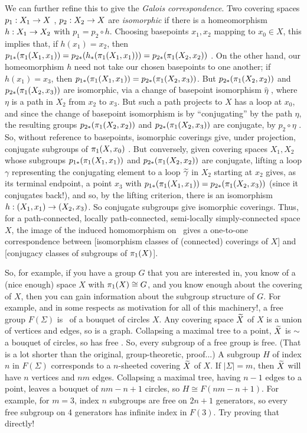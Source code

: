 We can further refine this to give the {\it Galois correspondence}. Two covering spaces
$p_1:X_1\rightarrow X$ , $p_2:X_2\rightarrow X$ are {\it isomorphic} if there is a homeomorphism
$h:X_1\rightarrow X_2$ with $p_1=p_2\circ h$. Choosing basepoints $x_1,x_2$ mapping to $x_0\in X$,
this implies that, if $h(x_1)=x_2$, then $p_{1*}(\pi_1(X_1,x_1)) = p_{2*}(h_*(\pi_1(X_1,x_1))) = 
p_{2*}(\pi_1(X_2,x_2))$ . On the other hand, our homeomorphism $h$ need not take our
chosen basepoints to one another; if $h(x_1)=x_3$, then $p_{1*}(\pi_1(X_1,x_1)) = p_{2*}(\pi_1(X_2,x_3))$.
But  $p_{2*}(\pi_1(X_2,x_2))$ and $p_{2*}(\pi_1(X_2,x_3))$ are isomorphic, via a change 
of basepoint isomorphism $\widehat{\eta}$ , where $\eta$ is a path in $X_2$ from $x_2$ to $x_3$.
But such a path projects to $X$ has a loop at $x_0$, and since the change of basepoint isomorphism
is by ``conjugating'' by the path $\eta$, the resulting groups $p_{2*}(\pi_1(X_2,x_2))$ and $p_{2*}(\pi_1(X_2,x_3))$
are conjugate, by $p_2\circ \eta$ . So, without reference to basepoints, isomorphic coverings give,
under projection, conjugate subgroups of $\pi_1(X,x_0)$ . But conversely, given covering spaces
$X_1,X_2$ whose subgroups $p_{1*}(\pi_1(X_1,x_1))$ and $p_{2*}(\pi_1(X_2,x_2))$ are conjugate,
lifting a loop $\gamma$ representing the conjugating element to a loop $\widetilde{\gamma}$ in
$X_2$ starting at $x_2$ gives, as its terminal endpoint, a point $x_3$ with 
$p_{1*}(\pi_1(X_1,x_1)) = p_{2*}(\pi_1(X_2,x_3))$ (since it conjugates back!), and so, by the lifting criterion,
there is an isomorphism $h:(X_1,x_1) \rightarrow (X_2,x_3)$. So conjugate subgroups give isomorphic coverings.
Thus, for a path-connected, locally path-connected, semi-locally simply-connected space $X$,  
the image of the induced homomorphism on \mpu\ 
gives a one-to-one correspondence between 
[isomorphism classes of (connected) coverings of $X$] and 
[conjugacy classes of subgroups of $\pi_1(X)$].

\msk

So, for example, if you have a group $G$ that you are interested in, you know of a (nice enough) 
space $X$ with $\pi_1(X)\cong G$, and you know enough about the covering of $X$, then you can
gain information about the subgroup structure of $G$. For example, and in some respects as
motivation for all of this machinery!, a free group $F(\Sigma)$ is \mpu\ of a bouquet of circles $X$. 
Any covering space $\widetilde{X}$ of $X$ is a union of vertices and edges, so is a graph.  Collapsing
a maximal tree to a point, $\widetilde{X}$ is $\sim$ a bouquet of circles, so has free \mpu . So, every
subgroup of a free group is free. (That is a lot shorter than the original, group-theoretic, proof...) 
A subgroup $H$ of index $n$ in $F(\Sigma)$ corresponds to a $n$-sheeted covering $\widetilde{X}$ of $X$. If
$|\Sigma| = m$, then $\widetilde{X}$ will have $n$ vertices and $nm$ edges. Collapsing a maximal
tree, having $n-1$ edges to a point, leaves a bouquet of $nm-n+1$ circles, so $H\cong F(nm-n+1)$.
For example, for $m=3$, index $n$ subgroups are free on $2n+1$ generators, so every free subgroup
on 4 generators has infinite index in $F(3)$. Try proving that directly!


